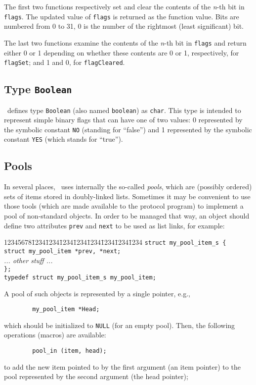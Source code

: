 The first two functions respectively set and clear
the contents of the {\em n\/}-th bit in {\tt flags}.
The updated value of {\tt flags} is returned as the function value.
Bits are numbered from 0 to
31, 0 is the number of the rightmost (least significant) bit.

The last two
functions examine the contents of the {\em n\/}-th bit in {\tt flags} and return
either 0 or 1 depending on whether these contents are 0 or 1,
respectively, for {\tt flagSet}; and 1 and 0, for {\tt flagCleared}.

\subsection{Type {\tt Boolean}}
\label{rm_au_tb}

\smurph\ defines type {\tt Boolean} (also named {\tt boolean}) as {\tt char}.
This type is intended to represent simple binary flags that can have one
of two values: 0 represented by the symbolic constant {\tt NO} (standing for
``false'') and 1 represented by the symbolic constant {\tt YES} (which stands
for ``true'').

\subsection{Pools}
\label{rm_au_po}

In several places, \smurph\ uses internally the so-called {\em pools}, which
are (possibly ordered) sets of items stored in doubly-linked lists.
Sometimes it may be convenient to use those tools (which are made available
to the protocol program) to implement a pool of non-standard objects.
In order to be managed that way, an object should define two attributes
{\tt prev} and {\tt next} to be used as list links, for example:
{\tt\begin{tabbing}
12345678\=1234\=1234\=1234\=1234\=1234\=1234\=1234\=1234\kill
\> {\tt struct my\_pool\_item\_s \{ }\\
\>\> {\tt struct my\_pool\_item *prev, *next; }\\
\>\> {\em ... other stuff ...}\\
\> {\tt \};}\\
\> {\tt typedef struct my\_pool\_item\_s my\_pool\_item; }
\end{tabbing}}
\noindent
A pool of such objects is represented by a single pointer, e.g.,
\begin{verbatim}
        my_pool_item *Head;
\end{verbatim}
which should be initialized to {\tt NULL} (for an empty pool).
Then, the following operations (macros) are available:
\begin{verbatim}
        pool_in (item, head);
\end{verbatim}
\noindent
to add the new item pointed to by the first argument (an item pointer)
to the pool represented by the second argument (the head pointer);

